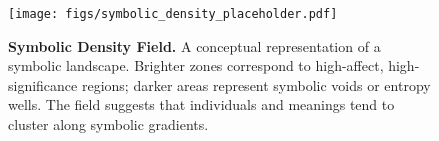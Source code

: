 \begin{figure}[H]
\centering
\texttt{[image: figs/symbolic\_density\_placeholder.pdf]}
\caption{\textbf{Symbolic Density Field.} A conceptual representation of a symbolic landscape. Brighter zones correspond to high-affect, high-significance regions; darker areas represent symbolic voids or entropy wells. The field suggests that individuals and meanings tend to cluster along symbolic gradients.}
\end{figure}